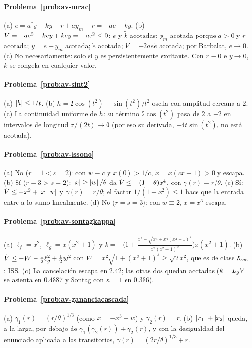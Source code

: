 \paragraph{Problema~\ref{prob:av-mrac}}
(a) $\dot e=a^*y-ky+r+ay_m-r=-ae-\tilde ky$. (b) $\dot V=-ae^2-\tilde key+\tilde key=-ae^2\le0$: $e$ y $\tilde k$ acotadas; $y_m$ acotada porque $a>0$ y $r$ acotada; $y=e+y_m$ acotada; $\dot e$ acotada; $\ddot V=-2ae\dot e$ acotada; por Barbalat, $e\to0$. (c) No necesariamente: solo si $y$ es persistentemente excitante. Con $r\equiv0$ e $y\to0$, $k$ se congela en cualquier valor.

\paragraph{Problema~\ref{prob:av-sint2}}
(a) $\left\lvert h\right\rvert\le1/t$. (b) $\dot h=2\cos(t^2)-\sin(t^2)/t^2$ oscila con amplitud cercana a $2$. (c) La continuidad uniforme de $\dot h$: su término $2\cos(t^2)$ pasa de $2$ a $-2$ en intervalos de longitud $\pi/(2t)\to0$ (por eso su derivada, $-4t\sin(t^2)$, no está acotada).

\paragraph{Problema~\ref{prob:av-issono}}
(a) No ($r=1<s=2$): con $w\equiv c$ y $x(0)>1/c$, $\dot x=x(cx-1)>0$ y escapa. (b) Sí ($r=3>s=2$): $\left\lvert x\right\rvert\ge\left\lvert w\right\rvert/\theta$ da $\dot V\le-(1-\theta)x^4$, con $\gamma(r)=r/\theta$. (c) Sí: $\dot V\le-x^2+\left\lvert x\right\rvert\left\lvert w\right\rvert$ y $\gamma(r)=r/\theta$; el factor $1/(1+x^2)\le1$ hace que la entrada entre a lo sumo linealmente. (d) No ($r=s=3$): con $w\equiv2$, $\dot x=x^3$ escapa.

\paragraph{Problema~\ref{prob:av-sontagkappa}}
(a) $\ell_f=x^2$, $\ell_g=x(x^2+1)$ y $k=-\bigl(1+\frac{x^2+\sqrt{x^4+x^4(x^2+1)^4}}{x^2(x^2+1)^2}\bigr)x(x^2+1)$. (b) $\dot V\le-W-\tfrac12\ell_g^2+\tfrac12w^2$ con $W=x^2\sqrt{1+(x^2+1)^4}\ge\sqrt2x^2$, que es de clase $\mathcal{K}_{\infty}$: ISS. (c) La cancelación escapa en $2.42$; las otras dos quedan acotadas ($k-L_{g}V$ se asienta en $0.4887$ y Sontag con $\kappa=1$ en $0.386$).

\paragraph{Problema~\ref{prob:av-gananciacascada}}
(a) $\gamma_1(r)=(r/\theta)^{1/3}$ (como $\dot x=-x^3+w$) y $\gamma_2(r)=r$. (b) $\left\lvert x_1\right\rvert+\left\lvert x_2\right\rvert$ queda, a la larga, por debajo de $\gamma_1(\gamma_2(r))+\gamma_2(r)$, y con la desigualdad del enunciado aplicada a los transitorios, $\gamma(r)=(2r/\theta)^{1/3}+r$.

